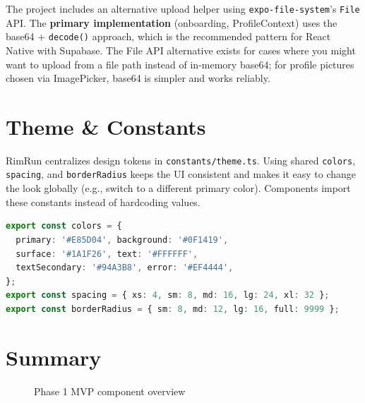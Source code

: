 \documentclass[11pt,a4paper]{article}
\begin{document}
The project includes an alternative upload helper using \texttt{expo-file-system}'s \texttt{File} API. The \textbf{primary implementation} (onboarding, ProfileContext) uses the base64 + \texttt{decode()} approach, which is the recommended pattern for React Native with Supabase. The File API alternative exists for cases where you might want to upload from a file path instead of in-memory base64; for profile pictures chosen via ImagePicker, base64 is simpler and works reliably.

\section{Theme \& Constants}

RimRun centralizes design tokens in \texttt{constants/theme.ts}. Using shared \texttt{colors}, \texttt{spacing}, and \texttt{borderRadius} keeps the UI consistent and makes it easy to change the look globally (e.g., switch to a different primary color). Components import these constants instead of hardcoding values.

\begin{lstlisting}[language=TypeScript, caption=Theme Constants]
export const colors = {
  primary: '#E85D04', background: '#0F1419',
  surface: '#1A1F26', text: '#FFFFFF',
  textSecondary: '#94A3B8', error: '#EF4444',
};
export const spacing = { xs: 4, sm: 8, md: 16, lg: 24, xl: 32 };
export const borderRadius = { sm: 8, md: 12, lg: 16, full: 9999 };
\end{lstlisting}

\section{Summary}

\begin{figure}[h]
\centering
{}
\caption{Phase 1 MVP component overview}
\end{figure}
\end{document}
